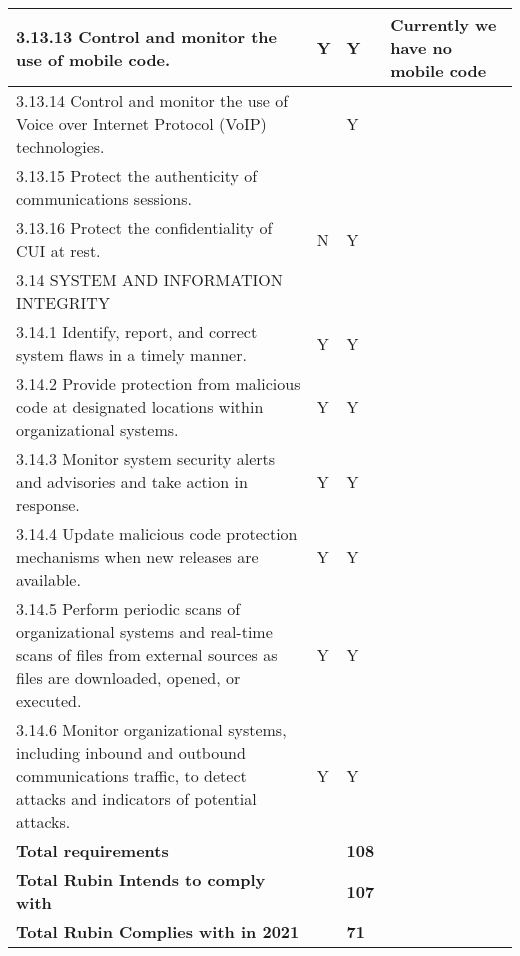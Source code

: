 \begin{longtable} {|p{}|p{}|p{}|p{} |}
{3.13.13 Control and monitor the use of mobile code.}&{Y}&{Y}&{Currently we have no mobile code} \\ \hline
{3.13.14 Control and monitor the use of Voice over Internet Protocol (VoIP) technologies.}&{}&{Y}& \\ \hline
{3.13.15 Protect the authenticity of communications sessions.}&&& \\ \hline
{3.13.16 Protect the confidentiality of CUI at rest.}&{N}&{Y}& \\ \hline
{3.14 SYSTEM AND INFORMATION INTEGRITY}&&& \\ \hline
{3.14.1 Identify, report, and correct system flaws in a timely manner.}&{Y}&{Y}& \\ \hline
{3.14.2 Provide protection from malicious code at designated locations within organizational systems.}&{Y}&{Y}& \\ \hline
{3.14.3 Monitor system security alerts and advisories and take action in response.}&{Y}&{Y}& \\ \hline
{3.14.4 Update malicious code protection mechanisms when new releases are available.}&{Y}&{Y}& \\ \hline
{3.14.5 Perform periodic scans of organizational systems and real-time scans of files from external sources as files are downloaded, opened, or executed.}&{Y}&{Y}& \\ \hline
{3.14.6 Monitor organizational systems, including inbound and outbound communications traffic, to detect attacks and indicators of potential attacks.}&{Y}&{Y}& \\ \hline
\textbf{Total requirements}&\textbf{}&\textbf{108}& \\ \hline
\textbf{Total Rubin Intends to comply with }&\textbf{}&\textbf{107}& \\ \hline
\textbf{Total Rubin Complies with in 2021}&\textbf{}&\textbf{71}& \\ \hline
\end{longtable} \normalsize
